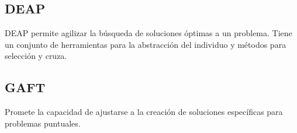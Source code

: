 \documentclass[10pt,dvipsnames]{beamer}
\begin{document}
  \begin{frame} \section*{DEAP}
    \begin{blur}[title={DEAP}]

      DEAP permite agilizar la búsqueda
      de soluciones óptimas a un problema. Tiene un conjunto de herramientas
      para la abstracción del individuo y métodos para selección y cruza.

    \end{blur}
  \end{frame}


  \begin{frame} \section*{GAFT}
    \begin{blur}[title={GAFT}]

    Promete la capacidad de ajustarse a la creación de soluciones específicas
    para problemas puntuales.

    \end{blur}
  \end{frame}

  \begin{frame}
    \begin{blur}
      \printbibliography
    \end{blur}
  \end{frame}
\end{document}
